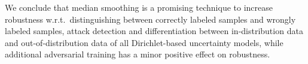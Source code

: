 We conclude that median smoothing is a promising technique to increase robustness w.r.t.\ distinguishing between correctly labeled samples and wrongly labeled samples, attack detection and differentiation between in-distribution data and out-of-distribution data of all Dirichlet-based uncertainty models, while additional adversarial training has a minor positive effect on robustness. 


